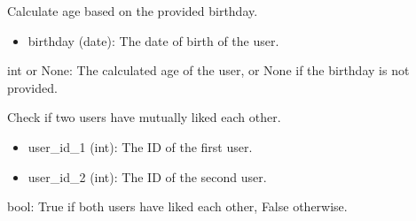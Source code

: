 \documentclass[letterpaper,10pt,english]{sphinxmanual}
\begin{document}
\begin{fulllineitems}
\label{\detokenize{routes.feed:routes.feed.routes.calculate_age}}
\pysigstartsignatures
{}
\pysigstopsignatures
\sphinxAtStartPar
Calculate age based on the provided birthday.
\begin{description}
\begin{itemize}
\item {} 
\sphinxAtStartPar
birthday (date): The date of birth of the user.

\end{itemize}

\sphinxAtStartPar
int or None: The calculated age of the user, or None if the birthday is not provided.

\end{description}

\end{fulllineitems}


\begin{fulllineitems}
\label{\detokenize{routes.feed:routes.feed.routes.check_for_match}}
\pysigstartsignatures
{}
\pysigstopsignatures
\sphinxAtStartPar
Check if two users have mutually liked each other.
\begin{description}
\begin{itemize}
\item {} 
\sphinxAtStartPar
user\_id\_1 (int): The ID of the first user.

\item {} 
\sphinxAtStartPar
user\_id\_2 (int): The ID of the second user.

\end{itemize}

\sphinxAtStartPar
bool: True if both users have liked each other, False otherwise.

\end{description}

\end{fulllineitems}
\end{document}

